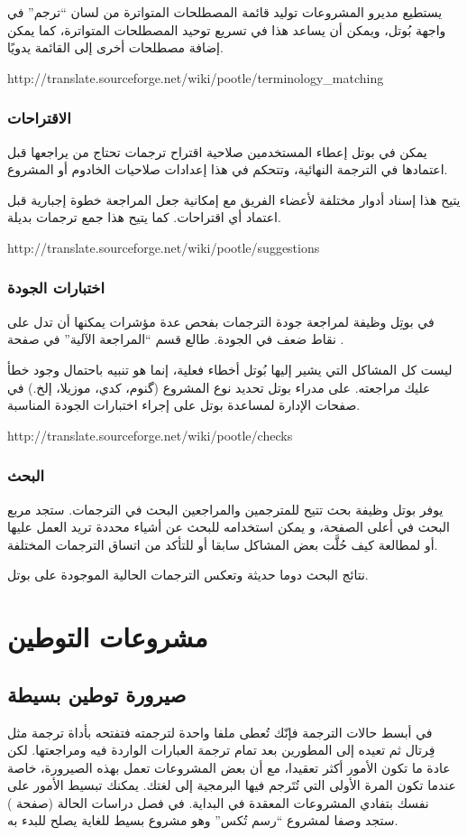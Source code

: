 يستطيع مديرو المشروعات توليد قائمة المصطلحات المتواترة من لسان “ترجم” في
واجهة بُوتل، ويمكن أن يساعد هذا في تسريع توحيد المصطلحات المتواترة، كما
يمكن إضافة مصطلحات أخرى إلى القائمة يدويًا.

http://translate.sourceforge.net/wiki/pootle/terminology\_matching

\subsection{الاقتراحات}
يمكن في بوتل إعطاء المستخدمين صلاحية اقتراح ترجمات تحتاج من يراجعها قبل
اعتمادها في الترجمة النهائية، وتتحكم في هذا إعدادات صلاحيات الخادوم أو
المشروع.

يتيح هذا إسناد أدوار مختلفة لأعضاء الفريق مع إمكانية جعل المراجعة خطوة
إجبارية قبل اعتماد أي اقتراحات. كما يتيح هذا جمع ترجمات بديلة.

http://translate.sourceforge.net/wiki/pootle/suggestions

\subsection{اختبارات الجودة}
في بوتِل وظيفة لمراجعة جودة الترجمات بفحص عدة مؤشرات يمكنها أن تدل على
نقاط ضعف في الجودة. طالع قسم “المراجعة الآلية” في صفحة
\at[ref:36134309].

ليست كل المشاكل التي يشير إليها بُوتل أخطاء فعلية، إنما هو تنبيه باحتمال
وجود خطأ عليك مراجعته. على مدراء بوتل تحديد نوع المشروع (گنوم، كدي،
موزيلا، إلخ.) في صفحات الإدارة لمساعدة بوتل على إجراء اختبارات الجودة
المناسبة.

http://translate.sourceforge.net/wiki/pootle/checks

\subsection{البحث}
يوفر بوتل وظيفة بحث تتيح للمترجمين والمراجعين البحث في الترجمات. ستجد
مربع البحث في أعلى الصفحة، و يمكن استخدامه للبحث عن أشياء محددة تريد
العمل عليها أو لمطالعة كيف حُلَّت بعض المشاكل سابقا أو للتأكد من اتساق
الترجمات المختلفة.

نتائج البحث دوما حديثة وتعكس الترجمات الحالية الموجودة على بوتل.

\chapter{مشروعات التوطين}
\section[ref:38565525]{صيرورة توطين بسيطة}
في أبسط حالات الترجمة فإنّك تُعطى
ملفا واحدة لترجمته فتفتحه بأداة ترجمة مثل فِرتال ثم تعيده إلى المطورين
بعد تمام ترجمة العبارات الواردة فيه ومراجعتها. لكن عادة ما تكون الأمور
أكثر تعقيدا، مع أن بعض المشروعات تعمل بهذه الصيرورة، خاصة عندما تكون
المرة الأولى التي تُتَرجم فيها البرمجية إلى لغتك. يمكنك تبسيط الأمور
على نفسك بتفادي المشروعات المعقدة في البداية. في فصل دراسات الحالة
(صفحة \at[ref:34376426]) ستجد وصفا لمشروع “رسم تُكس” وهو
مشروع بسيط للغاية يصلح للبدء به.

